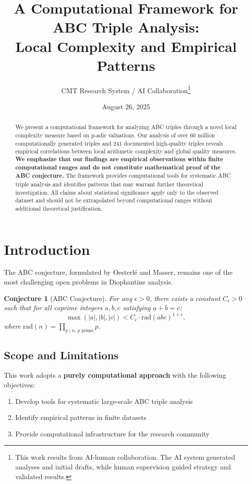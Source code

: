 \documentclass[11pt,a4paper]{article}
\title{\textbf{A Computational Framework for ABC Triple Analysis:}\\Local Complexity and Empirical Patterns}
\author{CMT Research System / AI Collaboration\thanks{This work results from AI-human collaboration. The AI system generated analyses and initial drafts, while human supervision guided strategy and validated results.}}
\date{August 26, 2025}
\newtheorem{conjecture}{Conjecture}[section]
\newcommand{\rad}{\mathrm{rad}}
\begin{document}
\maketitle

\begin{abstract}
We present a computational framework for analyzing ABC triples through a novel local complexity measure based on p-adic valuations. Our analysis of over 60 million computationally generated triples and 241 documented high-quality triples reveals empirical correlations between local arithmetic complexity and global quality measures. \textbf{We emphasize that our findings are empirical observations within finite computational ranges and do not constitute mathematical proof of the ABC conjecture.} The framework provides computational tools for systematic ABC triple analysis and identifies patterns that may warrant further theoretical investigation. All claims about statistical significance apply only to the observed dataset and should not be extrapolated beyond computational ranges without additional theoretical justification.
\end{abstract}

\tableofcontents
\bigskip

\section{Introduction}

The ABC conjecture, formulated by Oesterlé and Masser, remains one of the most challenging open problems in Diophantine analysis.

\begin{conjecture}[ABC Conjecture]
For any $\epsilon > 0$, there exists a constant $C_\epsilon > 0$ such that for all coprime integers $a, b, c$ satisfying $a+b=c$:
\[
    \max(|a|,|b|,|c|) < C_\epsilon \cdot \rad(abc)^{1+\epsilon},
\]
where $\rad(n) = \prod_{p\mid n, \, p \text{ prime}} p$.
\end{conjecture}

\subsection{Scope and Limitations}

This work adopts a \textbf{purely computational approach} with the following objectives:
\begin{enumerate}
    \item Develop tools for systematic large-scale ABC triple analysis
    \item Identify empirical patterns in finite datasets
    \item Provide computational infrastructure for the research community
\end{enumerate}
\end{document}
